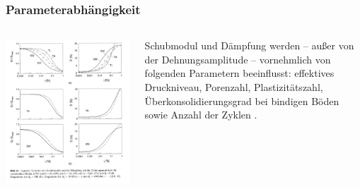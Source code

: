 \documentclass[hyperref={pdfpagemode=FullScreen, colorlinks=false}]{beamer}
\begin{document}
\begin{frame}
\frametitle{Parameterabhängigkeit}
\begin{columns}
\begin{column}[t]{.475\linewidth}
\includegraphics[width=\linewidth]{fig_img/bild16.jpg}
\end{column}
\begin{column}[t]{.525\linewidth}
\vspace{-5cm}

Schubmodul und Dämpfung werden -- außer von der Dehnungsamplitude -- vornehmlich von folgenden Parametern beeinflusst: effektives Druckniveau, Porenzahl, Plastizitätszahl, Überkonsolidierungsgrad bei bindigen Böden sowie Anzahl der Zyklen \cite{Vrettos2017}.
\end{column}
\end{columns}
\end{frame}
\end{document}
